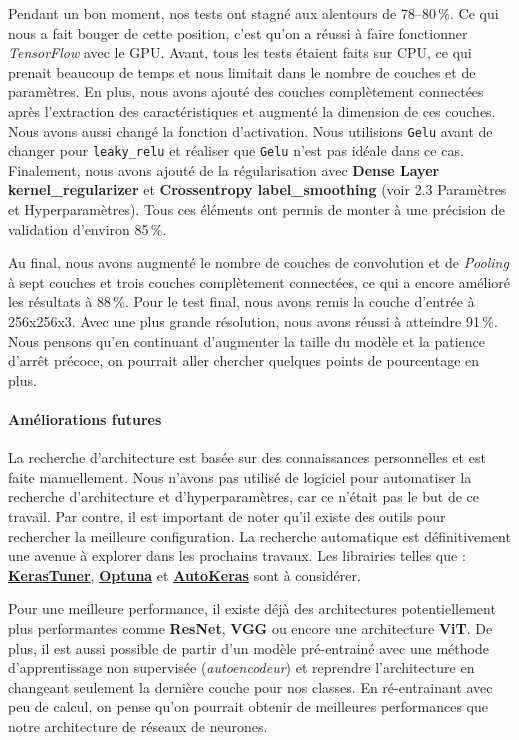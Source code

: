 \documentclass{article}
\begin{document}
Pendant un bon moment, nos tests ont stagné aux alentours de 78--80\,\%. Ce qui nous a fait bouger de cette position, c'est qu'on a réussi à faire fonctionner \emph{TensorFlow} avec le GPU. Avant, tous les tests étaient faits sur CPU, ce qui prenait beaucoup de temps et nous limitait dans le nombre de couches et de paramètres. En plus, nous avons ajouté des couches complètement connectées après l'extraction des caractéristiques et augmenté la dimension de ces couches. Nous avons aussi changé la fonction d'activation. Nous utilisions \texttt{Gelu} avant de changer pour \texttt{leaky\_relu} et réaliser que \texttt{Gelu} n'est pas idéale dans ce cas. Finalement, nous avons ajouté de la régularisation avec \textbf{Dense Layer kernel\_regularizer} et \textbf{Crossentropy label\_smoothing} (voir 2.3 Paramètres et Hyperparamètres). Tous ces éléments ont permis de monter à une précision de validation d'environ 85\,\%.

Au final, nous avons augmenté le nombre de couches de convolution et de \emph{Pooling} à sept couches et trois couches complètement connectées, ce qui a encore amélioré les résultats à 88\,\%. Pour le test final, nous avons remis la couche d'entrée à 256x256x3. Avec une plus grande résolution, nous avons réussi à atteindre 91\,\%. Nous pensons qu'en continuant d'augmenter la taille du modèle et la patience d'arrêt précoce, on pourrait aller chercher quelques points de pourcentage en plus.

\paragraph{Améliorations futures}

La recherche d'architecture est basée sur des connaissances personnelles et est faite manuellement. Nous n'avons pas utilisé de logiciel pour automatiser la recherche d'architecture et d'hyperparamètres, car ce n'était pas le but de ce travail. Par contre, il est important de noter qu'il existe des outils pour rechercher la meilleure configuration. La recherche automatique est définitivement une avenue à explorer dans les prochains travaux. Les librairies telles que : \href{https://keras.io/keras_tuner/}{\textbf{KerasTuner}}, \href{https://optuna.readthedocs.io/en/stable/index.html}{\textbf{Optuna}} et \href{https://autokeras.com/}{\textbf{AutoKeras}} sont à considérer.

Pour une meilleure performance, il existe déjà des architectures potentiellement plus performantes comme \textbf{ResNet}, \textbf{VGG} ou encore une architecture \textbf{ViT}. De plus, il est aussi possible de partir d'un modèle pré-entrainé avec une méthode d'apprentissage non supervisée (\emph{autoencodeur}) et reprendre l'architecture en changeant seulement la dernière couche pour nos classes. En ré-entrainant avec peu de calcul, on pense qu'on pourrait obtenir de meilleures performances que notre architecture de réseaux de neurones.
\end{document}
